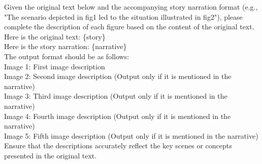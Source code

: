 \begin{tcolorbox}[prompt, title=Image description generator]
Given the original text below and the accompanying story narration format (e.g., "The scenario depicted in fig1 led to the situation illustrated in fig2"), please complete the description of each figure based on the content of the original text.\\
Here is the original text: \{story\}\\
Here is the story narration: \{narrative\}\\

The output format should be as follows:\\
Image 1: First image description\\
Image 2: Second image description (Output only if it is mentioned in the narrative)\\
Image 3: Third image description (Output only if it is mentioned in the narrative)\\
Image 4: Fourth image description (Output only if it is mentioned in the narrative)\\
Image 5: Fifth image description (Output only if it is mentioned in the narrative)\\
Ensure that the descriptions accurately reflect the key scenes or concepts presented in the original text.
\end{tcolorbox}


